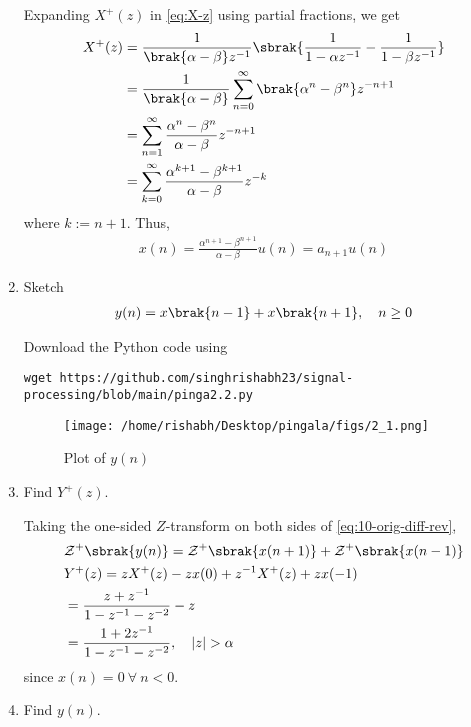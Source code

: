 \documentclass[journal,12pt,twocolumn]{IEEEtran}
\renewcommand\thesection{\arabic{section}}
\begin{document}
\begin{enumerate}[label=\thesection.\arabic*,ref=\thesection.\theenumi]
		\solution Expanding $X^+(z)$ in \eqref{eq:X-z} using partial fractions, we get
		\begin{align}
			X^+(z) &= \frac{1}{\brak{\alpha - \beta}z^{-1}}\sbrak{\frac{1}{1 - \alpha z^{-1}} - \frac{1}{1 - \beta z^{-1}}} \\
			&= \frac{1}{\brak{\alpha - \beta}}\sum_{n = 0}^{\infty}\brak{\alpha^n - \beta^n}z^{-n + 1} \\
			&= \sum_{n = 1}^{\infty}\frac{\alpha^{n} - \beta^{n}}{\alpha - \beta}z^{-n + 1} \\
			&= \sum_{k = 0}^{\infty}\frac{\alpha^{k + 1} - \beta^{k + 1}}{\alpha - \beta}z^{-k}
		\end{align}
		where $k := n + 1$. Thus,
		\begin{align}
			x(n) = \frac{\alpha^{n + 1} - \beta^{n + 1}}{\alpha - \beta}u(n) = a_{n + 1}u(n)
			\label{eq:x-n-def}
		\end{align}
		\item Sketch 
		\begin{align}
			y(n) = x\brak{n-1} + x\brak{n+1},  \quad n \ge 0
			\label{eq:10-orig-diff-rev}
		\end{align}
		
		\solution
		Download the Python code using
		\begin{lstlisting}
wget https://github.com/singhrishabh23/signal-processing/blob/main/pinga2.2.py
		\end{lstlisting}
		\begin{figure}[!htbp]
			\texttt{[image: /home/rishabh/Desktop/pingala/figs/2\_1.png]}
			\caption{Plot of $y(n)$}
			\label{fig:yn}
		\end{figure}
		\item Find $Y^{+}(z)$. 
		
		\solution Taking the one-sided $Z$-transform on both sides of \eqref{eq:10-orig-diff-rev},
		\begin{align}
			&\mathcal{Z}^+\sbrak{y(n)} = \mathcal{Z}^+\sbrak{x(n + 1)} + \mathcal{Z}^+\sbrak{x(n - 1)} \\
			&Y^+(z) = zX^+(z) - zx(0) + z^{-1}X^+(z) + zx(-1) \\
			&= \frac{z + z^{-1}}{1 - z^{-1} - z^{-2}} - z \\
			&= \frac{1 + 2z^{-1}}{1 - z^{-1} - z^{-2}}, \quad |z| > \alpha
		\end{align}
		since $x(n) = 0\ \forall\ n < 0$.
		\item Find $y(n)$.
		\label{pr:1-3}
		

\end{enumerate}
\end{document}
